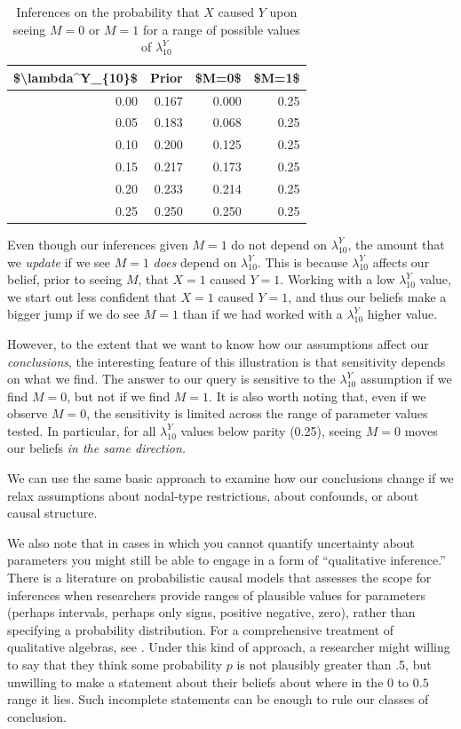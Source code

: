 \documentclass[
  12pt,
]{book}
\begin{document}
\begin{table}

\caption{\label{tab:ch15ranges}Inferences on the probability that $X$ caused $Y$ upon seeing $M=0$ or $M=1$ for a range of possible values of $\lambda^Y_{10}$}
\centering
\begin{tabular}[t]{r|r|r|r}
\hline
\$\textbackslash{}lambda\textasciicircum{}Y\_\{10\}\$ & Prior & \$M=0\$ & \$M=1\$\\
\hline
0.00 & 0.167 & 0.000 & 0.25\\
\hline
0.05 & 0.183 & 0.068 & 0.25\\
\hline
0.10 & 0.200 & 0.125 & 0.25\\
\hline
0.15 & 0.217 & 0.173 & 0.25\\
\hline
0.20 & 0.233 & 0.214 & 0.25\\
\hline
0.25 & 0.250 & 0.250 & 0.25\\
\hline
\end{tabular}
\end{table}

Even though our inferences given \(M=1\) do not depend on \(\lambda^Y_{10}\), the amount that we \emph{update} if we see \(M=1\) \emph{does} depend on \(\lambda^Y_{10}\). This is because \(\lambda^Y_{10}\) affects our belief, prior to seeing \(M\), that \(X=1\) caused \(Y=1\). Working with a low \(\lambda^Y_{10}\) value, we start out less confident that \(X=1\) caused \(Y=1\), and thus our beliefs make a bigger jump if we do see \(M=1\) than if we had worked with a \(\lambda^Y_{10}\) higher value.

However, to the extent that we want to know how our assumptions affect our \emph{conclusions}, the interesting feature of this illustration is that sensitivity depends on what we find. The answer to our query is sensitive to the \(\lambda^Y_{10}\) assumption if we find \(M=0\), but not if we find \(M=1\). It is also worth noting that, even if we observe \(M=0\), the sensitivity is limited across the range of parameter values tested. In particular, for all \(\lambda^Y_{10}\) values below parity (0.25), seeing \(M=0\) moves our beliefs \emph{in the same direction.}

We can use the same basic approach to examine how our conclusions change if we relax assumptions about nodal-type restrictions, about confounds, or about causal structure.

We also note that in cases in which you cannot quantify uncertainty about parameters you might still be able to engage in a form of ``qualitative inference.'' There is a literature on probabilistic causal models that assesses the scope for inferences when researchers provide ranges of plausible values for parameters (perhaps intervals, perhaps only signs, positive negative, zero), rather than specifying a probability distribution. For a comprehensive treatment of qualitative algebras, see \citet{parsons2001qualitative}. Under this kind of approach, a researcher might willing to say that they think some probability \(p\) is not plausibly greater than .5, but unwilling to make a statement about their beliefs about where in the \(0\) to \(0.5\) range it lies. Such incomplete statements can be enough to rule our classes of conclusion.
\end{document}
